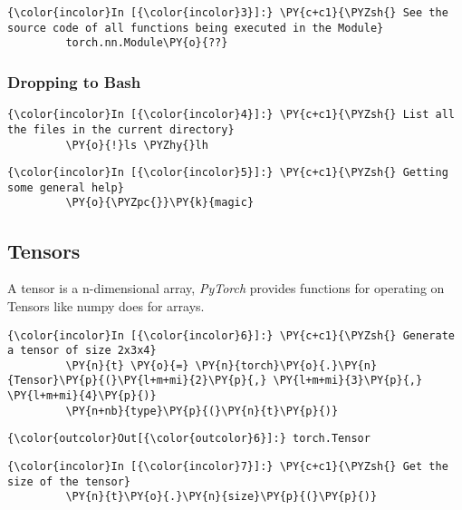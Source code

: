     \begin{Verbatim}[commandchars=\\\{\}]
{\color{incolor}In [{\color{incolor}3}]:} \PY{c+c1}{\PYZsh{} See the source code of all functions being executed in the Module}
         torch.nn.Module\PY{o}{??}
\end{Verbatim}
        
\subsubsection{Dropping to Bash}
\begin{Verbatim}[commandchars=\\\{\}]
{\color{incolor}In [{\color{incolor}4}]:} \PY{c+c1}{\PYZsh{} List all the files in the current directory}
         \PY{o}{!}ls \PYZhy{}lh 
\end{Verbatim}

\begin{Verbatim}[commandchars=\\\{\}]
{\color{incolor}In [{\color{incolor}5}]:} \PY{c+c1}{\PYZsh{} Getting some general help}
         \PY{o}{\PYZpc{}}\PY{k}{magic} 
\end{Verbatim}

\subsection{Tensors}\label{tensors}   
A tensor is a n-dimensional array, \emph{PyTorch} provides functions for operating on Tensors like numpy does for arrays.
\begin{Verbatim}[commandchars=\\\{\}]
{\color{incolor}In [{\color{incolor}6}]:} \PY{c+c1}{\PYZsh{} Generate a tensor of size 2x3x4}
         \PY{n}{t} \PY{o}{=} \PY{n}{torch}\PY{o}{.}\PY{n}{Tensor}\PY{p}{(}\PY{l+m+mi}{2}\PY{p}{,} \PY{l+m+mi}{3}\PY{p}{,} \PY{l+m+mi}{4}\PY{p}{)}
         \PY{n+nb}{type}\PY{p}{(}\PY{n}{t}\PY{p}{)} 
\end{Verbatim}


\begin{Verbatim}[commandchars=\\\{\}]
{\color{outcolor}Out[{\color{outcolor}6}]:} torch.Tensor
\end{Verbatim}
            
\begin{Verbatim}[commandchars=\\\{\}]
{\color{incolor}In [{\color{incolor}7}]:} \PY{c+c1}{\PYZsh{} Get the size of the tensor}
         \PY{n}{t}\PY{o}{.}\PY{n}{size}\PY{p}{(}\PY{p}{)} 
\end{Verbatim}


